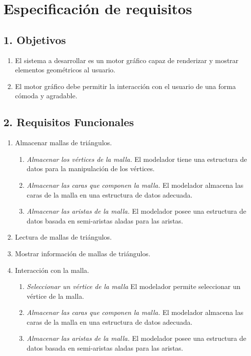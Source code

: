 \chapter*{Especificación de requisitos}

\section*{1. Objetivos}

\begin{enumerate}[label=\textbf{\textit{OBJ-\arabic*}}]
	\item El sistema a desarrollar es un motor gráfico capaz de renderizar y mostrar elementos geométricos al usuario.
	\item El motor gráfico debe permitir la interacción con el usuario de una forma cómoda y agradable.
	
\end{enumerate}

\section*{2. Requisitos Funcionales}


\begin{enumerate}[label=\textbf{\textit{RF-\arabic*}}]
	\item Almacenar mallas de triángulos.
	
	\begin{enumerate}[label*=\textbf{\textit{.\arabic*}}]
		\item \textit{Almacenar los vértices de la malla.} El modelador tiene una estructura de datos para la manipulación de los vértices.
		\item \textit{Almacenar las caras que componen la malla.} El modelador almacena las caras de la malla en una estructura de datos adecuada.
		\item \textit{Almacenar las aristas de la malla.} El modelador posee una estructura de datos basada en semi-aristas aladas para las aristas. 
	\end{enumerate}
	
	\item Lectura de mallas de triángulos.
	
	\item Mostrar información de mallas de triángulos.
	
	\item Interacción con la malla.
		\begin{enumerate}[label*=\textbf{\textit{.\arabic*}}]
		\item \textit{Seleccionar un vértice de la malla} El modelador permite seleccionar un vértice de la malla.
		\item \textit{Almacenar las caras que componen la malla.} El modelador almacena las caras de la malla en una estructura de datos adecuada.
		\item \textit{Almacenar las aristas de la malla.} El modelador posee una estructura de datos basada en semi-aristas aladas para las aristas. 
	\end{enumerate}
	
	
\end{enumerate}


